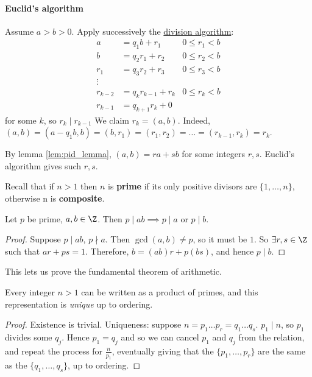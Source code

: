 \documentclass{article}
\begin{document}
\paragraph{Euclid's algorithm}
Assume $a > b > 0$. Apply successively the \hyperlink{def:divisionAlg}{division algorithm}:
\begin{align*}
    a &= q_1 b + r_1 & 0 \leq r_1 < b\\
    b &= q_2 r_1 + r_2 & 0 \leq r_2 < b\\
    r_1 &= q_3 r_2 + r_3 & 0 \leq r_3 < b\\
    \vdots \\
    r_{k-2} &= q_k r_{k-1} + r_k & 0 \leq r_k < b\\
    r_{k-1} &= q_{k+1} r_k + 0
\end{align*}
for some $k$, so $r_k \mid r_{k-1}$
We claim $r_k = (a, b)$. Indeed, $(a, b) = (a - q_1 b, b) = (b, r_1) = (r_1, r_2) = \dots = (r_{k-1}, r_k) = r_k$.
\begin{remark}
     By lemma \ref{lem:pid_lemma}, $(a, b) = r a + s b$ for some integers $r, s$. Euclid's algorithm gives such $r, s$.
\end{remark}

Recall that if $n > 1$ then $n$ is \textbf{prime} if its only positive divisors are $\{1, \dots, n\}$, otherwise n is \textbf{composite}.
\begin{nlemma}
    Let $p$ be prime, $a, b \in \Z$.  Then $p \mid ab \implies p \mid a$ or $p \mid b$.
\end{nlemma}

\begin{proof}
    Suppose $p \mid ab$, $p \nmid a$. Then $\gcd(a, b) \ne p$, so it must be $1$. So $\exists r, s \in \Z$ such that $ar + ps = 1$.
    Therefore, $b = (ab) r + p(bs)$, and hence $p \mid b$.
\end{proof}

This lets us prove the fundamental theorem of arithmetic.
\begin{thm}
    Every integer $n > 1$ can be written as a product of primes, and this representation is \emph{unique} up to ordering.
\end{thm}
\begin{proof}
    Existence is trivial. Uniqueness: suppose $n = p_1 \dots p_r = q_1 \dots q_s$. $p_1 \mid n$, so $p_1$ divides some $q_j$. Hence $p_1 = q_j$ and so we can cancel $p_1$ and $q_j$ from the relation, and repeat the process for $\frac{n}{p_1}$, eventually giving that the $\{p_1, \dots, p_r\}$ are the same as the $\{q_1, \dots, q_s\}$, up to ordering.
\end{proof}
\end{document}
